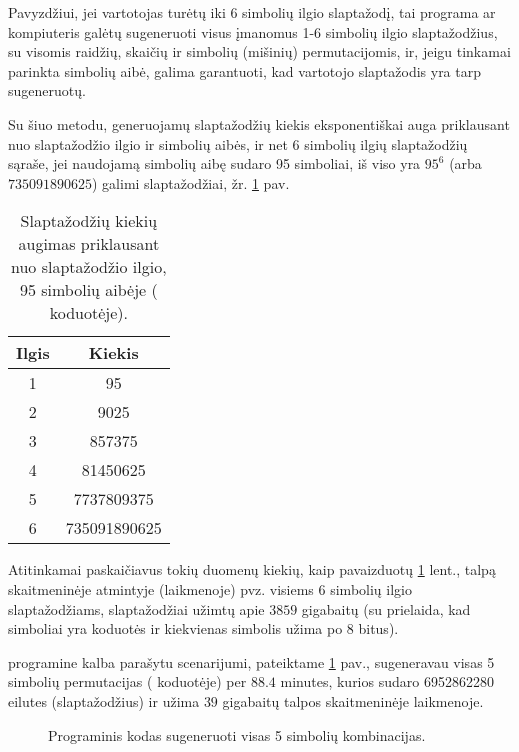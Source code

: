 \documentclass{VUMIFInfBakalaurinis}
\begin{document}
Pavyzdžiui, jei vartotojas turėtų iki 6 simbolių ilgio slaptažodį, tai programa 
ar kompiuteris galėtų sugeneruoti visus įmanomus 1-6 simbolių ilgio 
slaptažodžius, su visomis raidžių, skaičių ir simbolių (mišinių) permutacijomis, 
ir, jeigu tinkamai parinkta simbolių aibė, galima garantuoti, kad vartotojo 
slaptažodis yra tarp sugeneruotų.

Su šiuo metodu, generuojamų slaptažodžių kiekis eksponentiškai auga priklausant 
nuo slaptažodžio ilgio ir simbolių aibės, ir net 6 simbolių ilgių slaptažodžių 
sąraše, jei naudojamą simbolių aibę sudaro 95 simboliai, iš viso yra $95^6$ 
(arba $735091890625$) galimi slaptažodžiai, žr. \ref{tab:bruteforce} pav.

\begin{table}[hb]
  \centering
  \begin{tabular}{|c|c|}
    \hline \textbf{Ilgis} & \textbf{Kiekis} \\
    \hline 1 & 95 \\
    \hline 2 & 9025 \\
    \hline 3 & 857375 \\
    \hline 4 & 81450625 \\
    \hline 5 & 7737809375 \\
    \hline 6 & 735091890625 \\
    \hline
  \end{tabular}
  \caption{
    Slaptažodžių kiekių augimas priklausant nuo slaptažodžio ilgio, 95 simbolių 
    aibėje ( koduotėje).
  }
  \label{tab:bruteforce}
\end{table}

Atitinkamai paskaičiavus tokių duomenų kiekių, kaip pavaizduotų 
\ref{tab:bruteforce} lent., talpą skaitmeninėje atmintyje (laikmenoje) pvz. 
visiems 6 simbolių ilgio slaptažodžiams, slaptažodžiai užimtų apie $3859$ 
gigabaitų (su prielaida, kad simboliai yra  koduotės ir 
kiekvienas simbolis užima po 8 bitus).

 programine kalba parašytu scenarijumi, pateiktame 
\ref{fig:permutacijos} pav., sugeneravau visas 5 simbolių permutacijas 
( koduotėje) per $88.4$ minutes, kurios sudaro 6952862280 
eilutes (slaptažodžius) ir užima $39$ gigabaitų talpos skaitmeninėje laikmenoje.

\begin{figure}
  \begin{center}
    
    \caption{Programinis kodas sugeneruoti visas 5 simbolių kombinacijas.}
    \label{fig:permutacijos}
  \end{center}
\end{figure}
\end{document}
